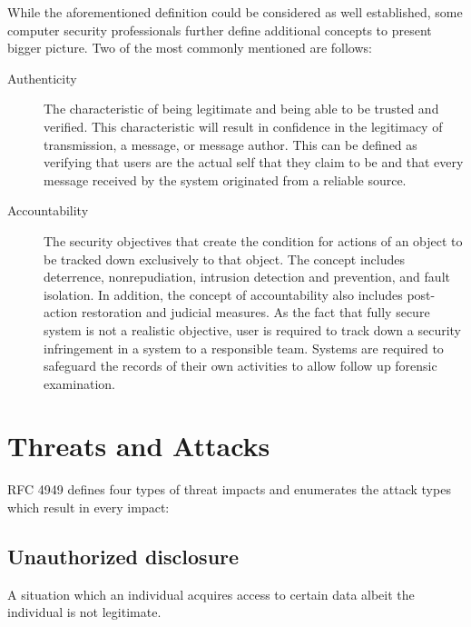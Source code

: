 \documentclass[../index.tex]{subfiles}
\begin{document}
While the aforementioned definition could be considered as well established, some computer security
professionals further define additional concepts to present bigger picture. Two of the most commonly
mentioned are follows:

\begin{description}

	\item[Authenticity] The characteristic of being legitimate and being able to be trusted and
		verified. This characteristic will result in confidence in the legitimacy of transmission, a
		message, or message author. This can be defined as verifying that users are the actual self that
		they claim to be and that every message received by the system originated from a reliable
		source.

	\item[Accountability] The security objectives that create the condition for actions of an object
		to be tracked down exclusively to that object. The concept includes deterrence, nonrepudiation,
		intrusion detection and prevention, and fault isolation. In addition, the concept of
		accountability also includes post-action restoration and judicial measures. As the fact that
		fully secure system is not a realistic objective, user is required to track down a security
		infringement in a system to a responsible team. Systems are required to safeguard the records of
		their own activities to allow follow up forensic examination.

\end{description}

\section{Threats and Attacks}

RFC 4949 defines four types of threat impacts and enumerates the attack types which result in every
impact:

\subsection{Unauthorized disclosure}

A situation which an individual acquires access to certain data albeit the individual is not
legitimate.
\end{document}
